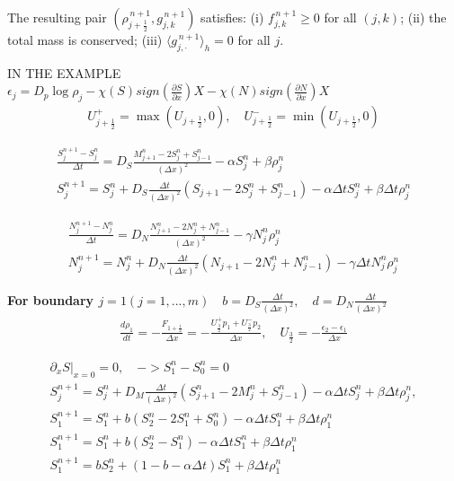 \documentclass[11pt,twoside]{article}
\theoremstyle{nonumberplain}
\begin{document}
The resulting pair $(\rho_{j+\frac12}^{\,n+1}, g_{j,k}^{\,n+1})$ satisfies:
(i) $f_{j,k}^{\,n+1}\ge 0$ for all $(j,k)$;  
(ii) the total mass is conserved;  
(iii) $\langle g_{j,\cdot}^{\,n+1}\rangle_h = 0$ for all $j$.

\iffalse
IN THE EXAMPLE\\
$\epsilon_j=D_p \log \rho_j-\chi(S) sign(\frac{\partial S}{\partial x})X-\chi(N) sign(\frac{\partial N}{\partial x})X$
\begin{eqnarray}
U^+_{j+\frac{1}{2}}=\max(U_{j+\frac{1}{2}},0), \quad U^-_{j+\frac{1}{2}}=\min (U_{j+\frac{1}{2}},0)
\end{eqnarray}

\begin{eqnarray}
\frac{S_j^{n+1}-S_j^n}{\Delta t}=D_S\frac{M_{j+1}^n-2S_j^n+S_{j-1}^n}{(\Delta x)^2}-\alpha S_j^n+\beta \rho_j^n\\
S_j^{n+1}=S_j^n+D_S \frac{\Delta t} {(\Delta x)^2}(S_{j+1}-2S_j^n+S_{j-1}^n)-\alpha \Delta t S_j^n+\beta \Delta t \rho_j^n
\end{eqnarray}


\begin{eqnarray}
\frac{N_j^{n+1}-N_j^n}{\Delta t}=D_N\frac{N_{j+1}^n-2N_j^n+N_{j-1}^n}{(\Delta x)^2}-\gamma N_j^n \rho_j^n\\
N_j^{n+1}=N_j^n+D_N \frac{\Delta t} {(\Delta x)^2}(N_{j+1}-2N_j^n+N_{j-1}^n)-\gamma \Delta t N_j^n \rho_j^n
\end{eqnarray}

\textbf{ For boundary $ j=1(j=1,...,m) \quad b=D_S \frac{\Delta t} {(\Delta x)^2}, \quad d=D_N \frac{\Delta t} {(\Delta x)^2}$}
\begin{eqnarray}
\frac{d\rho_1}{dt}=-\frac{F_{1+\frac{1}{2}}}{\Delta x}=-\frac{U^+_{\frac{3}{2}}p_1+U^-_{\frac{3}{2}}p_2 }{\Delta x}, \quad U_{\frac{3}{2}}=-\frac{\epsilon_2-\epsilon_1}{\Delta x}
\end{eqnarray}

 
\begin{eqnarray}
\partial_x S |_{x=0}= 0, \quad -> S^n_1-S^n_0=0\\
S_j^{n+1}=S_j^n+D_M \frac{\Delta t} {(\Delta x)^2}(S^n_{j+1}-2M_j^n+S_{j-1}^n)-\alpha \Delta t S_j^n+\beta \Delta t \rho_j^n, \\
S_1^{n+1}=S_1^n+b(S^n_{2}-2S_1^n+S_{0}^n)-\alpha \Delta t S_1^n+\beta \Delta t \rho_1^n\\
S_1^{n+1}=S_1^n+b(S^n_{2}-S_1^n)-\alpha \Delta t S_1^n+\beta \Delta t \rho_1^n\\
S_1^{n+1}=bS^n_2+(1-b-\alpha \Delta t)S_1^n+\beta \Delta t \rho_1^n
\end{eqnarray}
\end{document}
